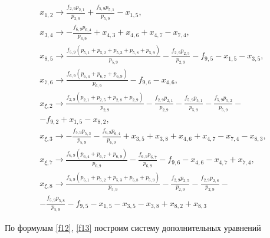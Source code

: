 \documentclass[14pt]{extarticle}%
\begin{document}
\begin{equation}\begin{gathered}
	x_{1,2}\to \frac{f_{2,9} p_{2,1}}{p_{2,9}}+\frac{f_{5,9} p_{5,1}}{p_{5,9}}-x_{1,5},\\
	x_{3,4}\to -\frac{f_{6,9} p_{6,4}}{p_{6,9}}+x_{4,3}+x_{4,6}+x_{4,7}-x_{7,4},\\
	x_{8,5}\to \frac{f_{5,9} \left(p_{5,1}+p_{5,2}+p_{5,3}+p_{5,8}+p_{5,9}\right)}{p_{5,9}}-\frac{f_{2,9} p_{2,5}}{p_{2,9}}-f_{9,5}-x_{1,5}-x_{3,5},\\
	x_{7,6}\to \frac{f_{6,9} \left(p_{6,4}+p_{6,7}+p_{6,9}\right)}{p_{6,9}}-f_{9,6}-x_{4,6},\\
	x_{\xi,2}\to \frac{f_{2,9} \left(p_{2,1}+p_{2,5}+p_{2,8}+p_{2,9}\right)}{p_{2,9}}-\frac{f_{2,9} p_{2,1}}{p_{2,9}}-\frac{f_{5,9} p_{5,1}}{p_{5,9}}-\frac{f_{5,9} p_{5,2}}{p_{5,9}}-\\-f_{9,2}+x_{1,5}-x_{8,2},\\
	x_{\xi,3}\to -\frac{f_{5,9} p_{5,3}}{p_{5,9}}-\frac{f_{6,9} p_{6,4}}{p_{6,9}}+x_{3,5}+x_{3,8}+x_{4,6}+x_{4,7}-x_{7,4}-x_{8,3},\\
	x_{\xi,7}\to \frac{f_{6,9} \left(p_{6,4}+p_{6,7}+p_{6,9}\right)}{p_{6,9}}-\frac{f_{6,9} p_{6,7}}{p_{6,9}}-f_{9,6}-x_{4,6}-x_{4,7}+x_{7,4},\\
	x_{\xi,8}\to \frac{f_{5,9} \left(p_{5,1}+p_{5,2}+p_{5,3}+p_{5,8}+p_{5,9}\right)}{p_{5,9}}-\frac{f_{2,9} p_{2,5}}{p_{2,9}}-\frac{f_{2,9} p_{2,8}}{p_{2,9}}-\\-\frac{f_{5,9} p_{5,8}}{p_{5,9}}-f_{9,5}-x_{1,5}-x_{3,5}-x_{3,8}+x_{8,2}+x_{8,3}
	\end{gathered}
\end{equation}

По формулам \eqref{f12}, \eqref{f13} построим систему дополнительных уравнений
\end{document}
